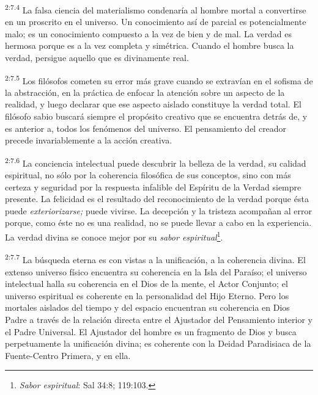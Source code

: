 \par
\textsuperscript{2:7.4} La falsa ciencia del materialismo condenaría al hombre mortal a convertirse en un proscrito en el universo. Un conocimiento así de parcial es potencialmente malo; es un conocimiento compuesto a la vez de bien y de mal. La verdad es hermosa porque es a la vez completa y simétrica. Cuando el hombre busca la verdad, persigue aquello que es divinamente real.

\par
\textsuperscript{2:7.5} Los filósofos cometen su error más grave cuando se extravían en el sofisma de la abstracción, en la práctica de enfocar la atención sobre un aspecto de la realidad, y luego declarar que ese aspecto aislado constituye la verdad total. El filósofo sabio buscará siempre el propósito creativo que se encuentra detrás de, y es anterior a, todos los fenómenos del universo. El pensamiento del creador precede invariablemente a la acción creativa.

\par
\textsuperscript{2:7.6} La conciencia intelectual puede descubrir la belleza de la verdad, su calidad espiritual, no sólo por la coherencia filosófica de sus conceptos, sino con más certeza y seguridad por la respuesta infalible del Espíritu de la Verdad siempre presente. La felicidad es el resultado del reconocimiento de la verdad porque ésta puede \textit{exteriorizarse;} puede vivirse. La decepción y la tristeza acompañan al error porque, como éste no es una realidad, no se puede llevar a cabo en la experiencia. La verdad divina se conoce mejor por su \textit{sabor espiritual}\footnote{\textit{Sabor espiritual}: Sal 34:8; 119:103.}.

\par
\textsuperscript{2:7.7} La búsqueda eterna es con vistas a la unificación, a la coherencia divina. El extenso universo físico encuentra su coherencia en la Isla del Paraíso; el universo intelectual halla su coherencia en el Dios de la mente, el Actor Conjunto; el universo espiritual es coherente en la personalidad del Hijo Eterno. Pero los mortales aislados del tiempo y del espacio encuentran su coherencia en Dios Padre a través de la relación directa entre el Ajustador del Pensamiento interior y el Padre Universal. El Ajustador del hombre es un fragmento de Dios y busca perpetuamente la unificación divina; es coherente con la Deidad Paradisiaca de la Fuente-Centro Primera, y en ella.

